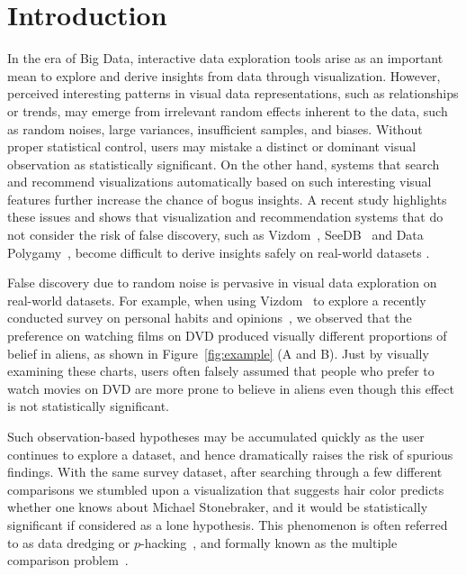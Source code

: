 
\section{Introduction}
\label{sec:intro}
In the era of Big Data, interactive data exploration tools arise as an important mean to explore and derive insights from data through visualization.  
However, perceived interesting patterns in visual data representations, such as relationships or trends, may emerge from irrelevant random effects inherent to the data, such as random noises, large variances, insufficient samples, and biases. 
Without proper statistical control, users may mistake a distinct or dominant visual observation as statistically significant.  
On the other hand, systems that search and recommend visualizations automatically based on such interesting visual features further increase the chance of bogus insights.  
A recent study highlights these issues and shows that visualization and recommendation systems that do not consider the risk of false discovery, such as Vizdom~\cite{vizdom}, SeeDB~\cite{seedb} and Data Polygamy~\cite{polygamy}, become difficult to derive insights safely on real-world datasets \cite{binnig2017sustainable}.

False discovery due to random noise is pervasive in visual data exploration on real-world datasets. For example, when using Vizdom~\cite{vizdom} to explore a recently conducted survey on personal habits and opinions~\cite{binnig2017sustainable}, we observed that the preference on watching films on DVD produced visually different proportions of belief in aliens, as shown in Figure~\ref{fig:example} (A and B).
Just by visually examining these charts, users often falsely assumed that people who prefer to watch movies on DVD are more prone to believe in aliens even though this effect is not statistically significant.

Such observation-based hypotheses may be accumulated quickly as the user continues to explore a dataset, and hence dramatically raises the risk of spurious findings. 
With the same survey dataset, after searching through a few different comparisons we stumbled upon a visualization that suggests hair color predicts whether one knows about Michael Stonebraker, and it would be statistically significant if considered as a lone hypothesis. This phenomenon is often referred to as data dredging or $p$-hacking~\cite{head2015extent}, and formally known as the multiple comparison problem~\cite{shaffer1995multiple}.

